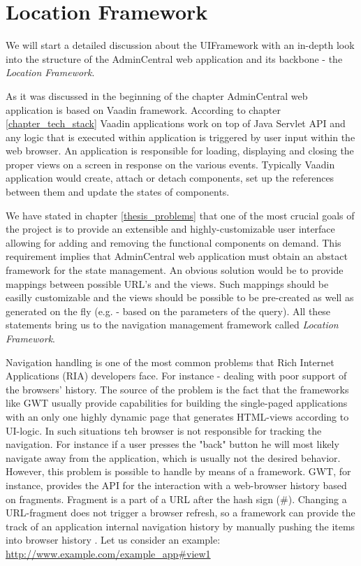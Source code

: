 \section{Location Framework}
We will start a detailed discussion about the UIFramework with an in-depth look
into the structure of the AdminCentral web application and its backbone - the
\emph{Location Framework}.

As it was discussed in the beginning of the chapter AdminCentral web application
is based on Vaadin framework. According to chapter \ref{chapter_tech_stack}
Vaadin applications work on top of Java Servlet API and any logic that is
executed within application is triggered by user input within the web browser.
An application is responsible for loading, displaying and closing the proper
views on a screen in response on the various events. Typically Vaadin
application would create, attach or detach components, set up the references
between them and update the states of components.

We have stated in chapter \ref{thesis_problems} that one of the most crucial
goals of the project is to provide an extensible and highly-customizable user
interface allowing for adding and removing the functional components on demand.
This requirement implies that AdminCentral web application must obtain an
abstact framework for the state management. An obvious solution would be to
provide mappings between possible URL's and the views. Such mappings should be
easilly customizable and the views should be possible to be pre-created as well
as generated on the fly (e.g. - based on the parameters of the query). All these
statements bring us to the navigation management framework called \emph{Location
Framework}.

Navigation handling is one of the most common problems that Rich Internet
Applications (RIA) developers face. For instance - dealing with poor support of
the browsers' history. The source of the problem is the fact that the frameworks
like GWT usually provide capabilities for building the single-paged applications
with an only one highly dynamic page that generates HTML-views according to
UI-logic. In such situations teh browser is not responsible for tracking the
navigation. For instance if a user presses the "back" button he will most likely
navigate away from the application, which is usually not the desired behavior.
However, this problem is possible to handle by means of a framework. GWT, for
instance, provides the API for the interaction with a web-browser history based
on fragments.
Fragment is a part of a URL after the hash sign (\#). Changing a URL-fragment
does not trigger a browser refresh, so a framework can provide the track of an
application internal navigation history by manually pushing the items into
browser history \cite{gwt_historian}.  Let us consider an example:
\url{http://www.example.com/example_app#view1}

